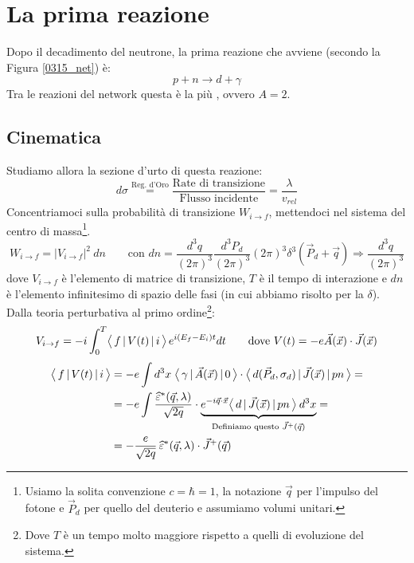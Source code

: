 \section{La prima reazione}\label{0317-sec-abinitio}
Dopo il decadimento del neutrone, la prima reazione che avviene (secondo la Figura \ref{0315_net}) è:
$$p + n \to d + \gamma$$
Tra le reazioni del network questa è la più , ovvero $A=2$. 

\subsection{Cinematica} 
Studiamo allora la sezione d'urto di questa reazione:
$$d\sigma \overset{\text{Reg. d'Oro}}{=} \frac{\text{Rate di transizione}}{\text{Flusso incidente}} = \frac{\lambda}{v_{rel}}$$
Concentriamoci sulla probabilità di transizione $W_{i\to f}$, mettendoci nel sistema del centro di massa\footnote{Usiamo la solita convenzione $c=\hbar = 1$, la notazione $\vec{q}$ per l'impulso del fotone e $\vec{P}_d$ per quello del deuterio e assumiamo volumi unitari.}.
$$W_{i\to f} = |V_{i\to f}|^2\:dn \qquad \text{con   } dn = \frac{d^3q}{(2\pi)^3}\frac{d^3P_d}{(2\pi)^3} (2\pi)^3 \delta^3(\vec{P}_d+\vec{q}) \Rightarrow \frac{d^3q}{(2\pi)^3}$$
dove $V_{i\to f}$ è l'elemento di matrice di transizione, $T$ è il tempo di interazione e $dn$ è l'elemento infinitesimo di spazio delle fasi (in cui abbiamo risolto per la $\delta$). Dalla teoria perturbativa al primo ordine\footnote{Dove $T$ è un tempo molto maggiore rispetto a quelli di evoluzione del sistema.}:
$$V_{i\to f} = -i \int_0^T \bigl\langle\, f\, |\,V(t)\, |\,i\, \bigr\rangle\, e^{i(E_f-E_i)t} dt \qquad \text{dove } V(t) = -e \vec{A}(\vec{x}) \cdot \vec{J}(\vec{x}) $$
\begin{displaymath}
\begin{aligned}
\bigl\langle\, f\, |\,V(t)\, |\,i\, \bigr\rangle &= - e\int d^3x \; \bigl\langle\, \gamma\, |\,\vec{A}(\vec{x})\, |\,0\, \bigr\rangle \cdot \bigl\langle\, d(\vec{P}_d,\sigma_d)\, |\,\vec{J}(\vec{x})\, |\,pn\, \bigr\rangle = \\
&= -e \int \frac{\widehat{\varepsilon}^*(\vec{q},\lambda)}{\sqrt{2q}} \cdot \underbrace{e^{-i\vec{q}\cdot\vec{x}}\bigl\langle\, d\, |\,\vec{J}(\vec{x})\, |\,pn\, \bigr\rangle\: d^3x}_{\text{Definiamo questo } \vec{J}^+(\vec{q})} = \\
&= -\frac{e}{\sqrt{2q}} \, \widehat{\varepsilon}^*(\vec{q},\lambda) \cdot \vec{J}^+(\vec{q})
\end{aligned}
\end{displaymath}

